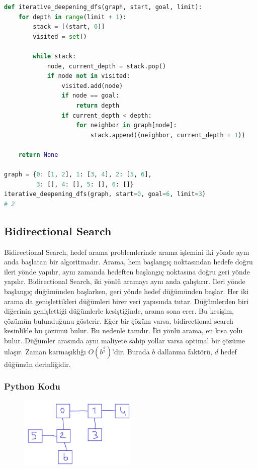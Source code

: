 \begin{lstlisting}[language=Python]
def iterative_deepening_dfs(graph, start, goal, limit):
    for depth in range(limit + 1):
        stack = [(start, 0)]
        visited = set()

        while stack:
            node, current_depth = stack.pop()
            if node not in visited:
                visited.add(node)
                if node == goal:
                    return depth
                if current_depth < depth:
                    for neighbor in graph[node]:
                        stack.append((neighbor, current_depth + 1))

    return None

graph = {0: [1, 2], 1: [3, 4], 2: [5, 6], 
         3: [], 4: [], 5: [], 6: []}
iterative_deepening_dfs(graph, start=0, goal=6, limit=3)
# 2
\end{lstlisting}

\newpage

\subsection{Bidirectional Search}

Bidirectional Search, hedef arama problemlerinde arama işlemini iki yönde aynı anda başlatan bir algoritmadır. Arama, hem başlangıç noktasından hedefe doğru ileri yönde yapılır, aynı zamanda hedeften başlangıç noktasına doğru geri yönde yapılır. Bidirectional Search, iki yönlü aramayı aynı anda çalıştırır. İleri yönde başlangıç düğümünden başlarken, geri yönde hedef düğümünden başlar. Her iki arama da genişlettikleri düğümleri birer veri yapısında tutar. Düğümlerden biri diğerinin genişlettiği düğümlerle kesiştiğinde, arama sona erer. Bu kesişim, çözümün bulunduğunu gösterir. Eğer bir çözüm varsa, bidirectional search kesinlikle bu çözümü bulur. Bu nedenle tamdır. İki yönlü arama, en kısa yolu bulur. Düğümler arasında aynı maliyete sahip yollar varsa optimal bir çözüme ulaşır. Zaman karmaşıklığı $O(b^{\frac{d}{2}})$'dir. Burada $b$ dallanma faktörü, $d$ hedef düğümün derinliğidir.

\subsubsection{Python Kodu}

\begin{figure}[h]
    \centering
    \includegraphics[width=0.5\textwidth]{images/bidirectional.png}
    \caption{}
\end{figure}

